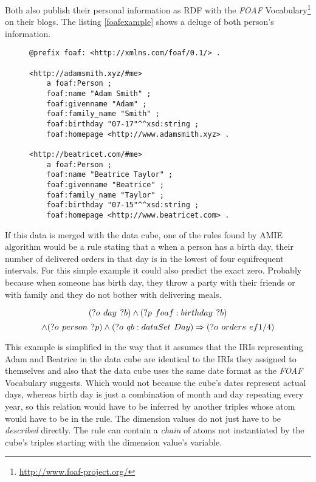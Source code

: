 Both also publish their personal information as RDF with the \textit{FOAF} Vocabulary\footnote{\href{http://www.foaf-project.org/}{http://www.foaf-project.org/}} on their blogs. The listing \ref{foafexample} shows a deluge of both person's information.

\begin{figure}[h]
\begin{lstlisting}[language = turtle, caption={RDF data published on Adam's and Beatrice's personal blogs}, label={foafexample},captionpos=b escapeinside={(*@}{@*)}]
@prefix foaf: <http://xmlns.com/foaf/0.1/> .

<http://adamsmith.xyz/#me>
    a foaf:Person ;
    foaf:name "Adam Smith" ;
    foaf:givenname "Adam" ;
    foaf:family_name "Smith" ;
    foaf:birthday "07-17"^^xsd:string ;
    foaf:homepage <http://www.adamsmith.xyz> .
      
<http://beatricet.com/#me>
    a foaf:Person ;
    foaf:name "Beatrice Taylor" ;
    foaf:givenname "Beatrice" ;
    foaf:family_name "Taylor" ;
    foaf:birthday "07-15"^^xsd:string ;
    foaf:homepage <http://www.beatricet.com> .
\end{lstlisting}
\end{figure}

If this data is merged with the data cube, one of the rules found by AMIE algorithm would be a rule stating that a when a person has a birth day, their number of delivered orders in that day is in the lowest of four equifrequent intervals. For this simple example it could also predict the exact zero. Probably because when someone has birth day, they throw a party with their friends or with family and they do not bother with delivering meals.

$$
(?o\hspace{0.4em}day\hspace{0.4em}?b) \land (?p\hspace{0.4em}foaf:birthday\hspace{0.4em}?b)
$$
$$ 
\land (?o\hspace{0.4em}person\hspace{0.4em}?p) \land (?o\hspace{0.4em}qb:dataSet\hspace{0.4em}Day)  \Rightarrow (?o\hspace{0.4em}orders\hspace{0.4em}ef1/4) 
$$

This example is simplified in the way that it assumes that the IRIs representing Adam and Beatrice in the data cube are identical to the IRIs they assigned to themselves and also that the data cube uses the same date format as the \textit{FOAF} Vocabulary suggests. Which would not because the cube's dates represent actual days, whereas birth day is just a combination of month and day repeating every year, so this relation would have to be inferred by another triples whose atom would have to be in the rule. The dimension values do not just have to be \textit{described} directly. The rule can contain a \textit{chain} of atoms not instantiated by the cube's triples starting with the dimension value's variable.

